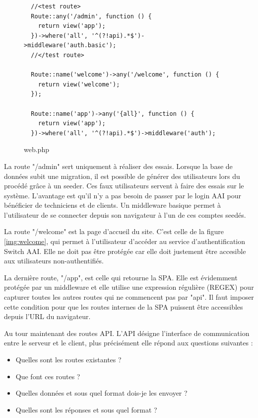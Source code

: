 \documentclass[
    iai, %
    eai, %
]{heig-tb}
\begin{document}
\begin{figure}[h]
  \begin{verbatim}
  //<test route>
  Route::any('/admin', function () {
    return view('app');
  })->where('all', '^(?!api).*$')->middleware('auth.basic');
  //</test route>

  Route::name('welcome')->any('/welcome', function () {
    return view('welcome');
  });

  Route::name('app')->any('{all}', function () {
    return view('app');
  })->where('all', '^(?!api).*$')->middleware('auth');
  \end{verbatim}
  \caption{web.php}
\end{figure}

La route "/admin" sert uniquement à réaliser des essais. Lorsque la base de données subit une migration, il est possible de générer des utilisateurs lors du procédé grâce à un seeder. Ces faux utilisateurs servent à faire des essais sur le système. L'avantage est qu'il n'y a pas besoin de passer par le login AAI pour bénéficier de techniciens et de clients. Un middleware basique permet à l'utilisateur de se connecter depuis son navigateur à l'un de ces comptes seedés.

La route "/welcome" est la page d'accueil du site. C'est celle de la figure \ref{img:welcome}, qui permet à l'utilisateur d'accéder au service d'authentification Switch AAI. Elle ne doit pas être protégée car elle doit justement être accesible aux utilisateurs non-authentifiés.

La dernière route, "/app", est celle qui retourne la SPA. Elle est évidemment protégée par un middleware et elle utilise une expression régulière (REGEX) pour capturer toutes les autres routes qui ne commencent pas par "api". Il faut imposer cette condition pour que les routes internes de la SPA puissent être accessibles depuis l'URL du navigateur.

\newpage
Au tour maintenant des routes API. L'API désigne l'interface de communication entre le serveur et le client, plus précisément elle répond aux questions suivantes :
\begin{itemize}
  \item Quelles sont les routes existantes ?
  \item Que font ces routes ?
  \item Quelles données et sous quel format dois-je les envoyer ?
  \item Quelles sont les réponses et sous quel format ?
\end{itemize}
\bigskip
\end{document}

